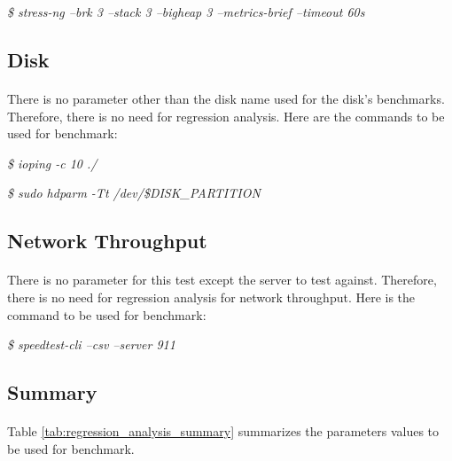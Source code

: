 \documentclass[11pt]{article}
\begin{document}
		\indent \textit{\$ stress-ng --brk 3 --stack 3 --bigheap 3 --metrics-brief --timeout 60s}
		
	\subsection{Disk}
		\paragraph{} There is no parameter other than the disk name used for the
		disk’s benchmarks. Therefore, there is no need for regression analysis.
		Here are the commands to be used for benchmark:
		
		\begin{description}
			\item \textit{\$ ioping -c 10 ./}
			\item \textit{\$ sudo hdparm -Tt /dev/\$DISK\_PARTITION}
		\end{description}

	\subsection{Network Throughput}
		\paragraph{} There is no parameter for this test except the server to test against. Therefore, there is no need for regression analysis for network throughput.
		Here is the command to be used for benchmark: \bigskip

		\indent \textit{\$ speedtest-cli --csv --server 911}
		
	\subsection{Summary}
		\paragraph{} Table \ref{tab:regression_analysis_summary} summarizes the parameters values to be
		used for benchmark. \bigskip
		
\end{document}
